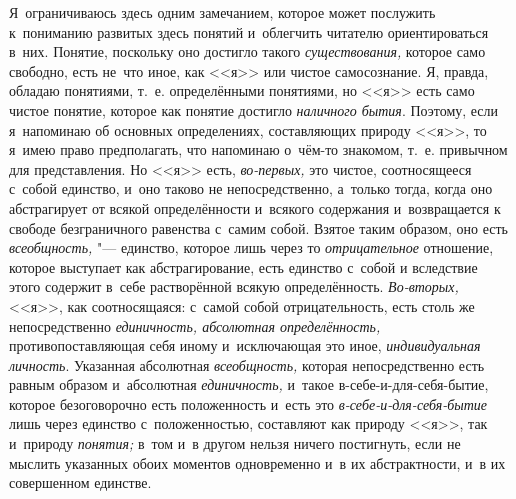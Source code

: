Я~ограничиваюсь здесь одним замечанием, которое может послужить к~пониманию
развитых здесь понятий и~облегчить читателю ориентироваться в~них. Понятие,
поскольку оно достигло такого {\em существования,} которое само свободно,
есть не~что иное, как <<я>> или чистое самосознание. Я, правда, обладаю
понятиями, т.~е. определёнными понятиями, но <<я>> есть само чистое понятие,
которое как понятие достигло {\em наличного бытия}. Поэтому, если я~напоминаю
об основных определениях, составляющих природу <<я>>, то я~имею право
предполагать, что напоминаю о~чём-то знакомом, т.~е. привычном для
представления. Но <<я>> есть, {\em во-первых,} это чистое, соотносящееся с~собой
единство, и~оно таково не непосредственно, а~только тогда, когда оно
абстрагирует от всякой определённости и~всякого содержания и~возвращается к
свободе безграничного равенства с~самим собой. Взятое таким образом, оно
есть {\em всеобщность,} "--- единство, которое лишь через то {\em отрицательное}
отношение, которое выступает как абстрагирование, есть единство с~собой и
вследствие этого содержит в~себе растворённой всякую определённость.
{\em Во-вторых,} <<я>>, как соотносящаяся: с~самой собой отрицательность, есть
столь же непосредственно {\em единичность, абсолютная определённость,}
противопоставляющая себя иному и~исключающая это иное, {\em индивидуальная
личность}. Указанная абсолютная {\em всеобщность,} которая непосредственно есть
равным образом и~абсолютная {\em единичность,} и~такое в-себе-и-для-себя-бытие,
которое безоговорочно есть положенность и~есть это
{\em в-себе-и-для-себя-бытие} лишь через единство с~положенностью, составляют
как природу <<я>>, так и~природу {\em понятия;} в~том и~в другом нельзя ничего
постигнуть, если не мыслить указанных обоих моментов одновременно и~в их
абстрактности, и~в их совершенном единстве.

